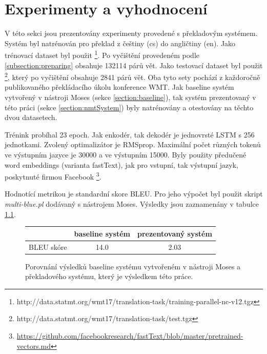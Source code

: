 
\chapter{Experimenty a vyhodnocení} \label{chapter:results}
V této sekci jsou prezentovány experimenty provedené s překladovým systémem. Systém byl natrénován pro překlad z češtiny (cs) do angličtiny (en). Jako trénovací dataset byl použit \footnote{http://data.statmt.org/wmt17/translation-task/training-parallel-nc-v12.tgz}. Po vyčištění provedeném podle \ref{subsection:preparing} obsahuje 132114 párů vět. Jako testovací dataset byl použit \footnote{http://data.statmt.org/wmt17/translation-task/test.tgz}, který po vyčištění obsahuje 2841 párů vět. Oba tyto sety pochází z každoročně publikovaného překládacího úkolu konference WMT. Jak baseline systém vytvořený v nástroji Moses (sekce \ref{section:baseline}), tak systém prezentovaný v této práci (sekce \ref{section:nmtSystem}) byly natrénovány a otestovány na těchto dvou datasetech.

Trénink probíhal 23 epoch. Jak enkodér, tak dekodér je jednovrsté LSTM s 256 jednotkami. Zvolený optimalizátor je RMSprop. Maximální počet různých tokenů ve výstupním jazyce je 30000 a ve výstupním 15000. Byly použity předučené word embeddings (varianta fastText), jak pro vstupní, tak výstupní jazyk, poskytnuté firmou Facebook \footnote{\url{https://github.com/facebookresearch/fastText/blob/master/pretrained-vectors.md}}.

Hodnotící metrikou je standardní skore BLEU. Pro jeho výpočet byl použit skript \emph{multi-blue.pl} dodávaný s nástrojem Moses. Výsledky jsou zaznamenány v tabulce \ref{table:results}.


\begin{figure}[H]
    \begin{center}
        \begin{tabular}{c|c|c}
          & baseline systém & prezentovaný systém \\
          \hline
          BLEU skóre & 14.0 & 2.03\\
          \hline
        \end{tabular}
    \end{center}
	\caption{Porovnání výsledků baseline systému vytvořeném v nástroji Moses a překladového systému, který je výsledkem této práce.}
	\label{table:results}
\end{figure}

